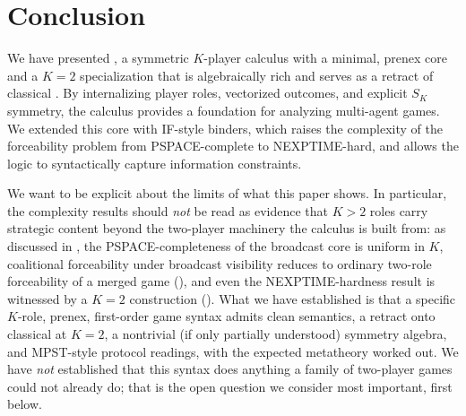 
\section{Conclusion}
\label{sec:conclusion}
We have presented \KFOL, a symmetric $K$-player calculus with a minimal,
prenex core and a $K=2$ specialization that is algebraically rich and
serves as a retract of classical \FOL. By internalizing player roles,
vectorized outcomes, and explicit $S_K$ symmetry, the calculus
provides a foundation for analyzing multi-agent games. We extended this
core with IF-style binders, which raises the complexity of the
forceability problem from PSPACE-complete to NEXPTIME-hard,
and allows the logic to syntactically capture information constraints.

We want to be explicit about the limits of what this paper shows. In
particular, the complexity results should \emph{not} be read as evidence that
$K>2$ roles carry strategic content beyond the two-player machinery the
calculus is built from: as discussed in , the
PSPACE-completeness of the broadcast core is uniform in $K$, coalitional
forceability under broadcast visibility reduces to ordinary two-role
forceability of a merged game (), and even
the NEXPTIME-hardness result is witnessed by a $K=2$ construction
(). What we have established is that a specific
$K$-role, prenex, first-order game syntax admits clean semantics, a retract
onto classical \FOL at $K=2$, a nontrivial (if only partially understood)
symmetry algebra, and MPST-style protocol readings, with the expected
metatheory worked out. We have \emph{not} established that this syntax does
anything a family of two-player games could not already do; that is the open
question we consider most important, first below.

